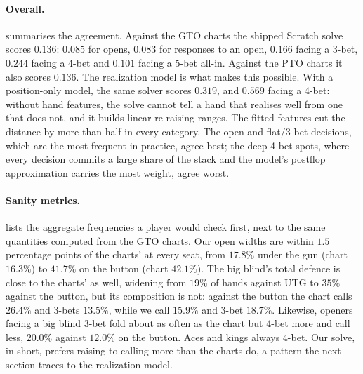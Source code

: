 \begin{table}[ht]
\centering\footnotesize\setlength{\tabcolsep}{3.5pt}
\caption{Distance of the Scratch solve to the reference charts by category (lower is better; $0$ is identical play), mean $\pm$ standard deviation over seeds. \enquote{Position only} sets every hand and role term of the realization model to zero (\cref{sec:realization}); \enquote{previous defaults} are the coordinate-search values; \enquote{adopted} are the shipped values (\cref{app:params}).}
\label{tab:scores}
\end{table}

\paragraph{Overall.}  summarises the agreement. Against the GTO charts the shipped Scratch solve scores $0.136$: $0.085$ for opens, $0.083$ for responses to an open, $0.166$ facing a 3-bet, $0.244$ facing a 4-bet and $0.101$ facing a 5-bet all-in. Against the PTO charts it also scores $0.136$. The realization model is what makes this possible. With a position-only model, the same solver scores $0.319$, and $0.569$ facing a 4-bet: without hand features, the solve cannot tell a hand that realises well from one that does not, and it builds linear re-raising ranges. The fitted features cut the distance by more than half in every category. The open and flat/3-bet decisions, which are the most frequent in practice, agree best; the deep 4-bet spots, where every decision commits a large share of the stack and the model's postflop approximation carries the most weight, agree worst.

\paragraph{Sanity metrics.}  lists the aggregate frequencies a player would check first, next to the same quantities computed from the GTO charts. Our open widths are within $1.5$ percentage points of the charts' at every seat, from $17.8\%$ under the gun (chart $16.3\%$) to $41.7\%$ on the button (chart $42.1\%$). The big blind's total defence is close to the charts' as well, widening from $19\%$ of hands against UTG to $35\%$ against the button, but its composition is not: against the button the chart calls $26.4\%$ and 3-bets $13.5\%$, while we call $15.9\%$ and 3-bet $18.7\%$. Likewise, openers facing a big blind 3-bet fold about as often as the chart but 4-bet more and call less, $20.0\%$ against $12.0\%$ on the button. Aces and kings always 4-bet. Our solve, in short, prefers raising to calling more than the charts do, a pattern the next section traces to the realization model.

